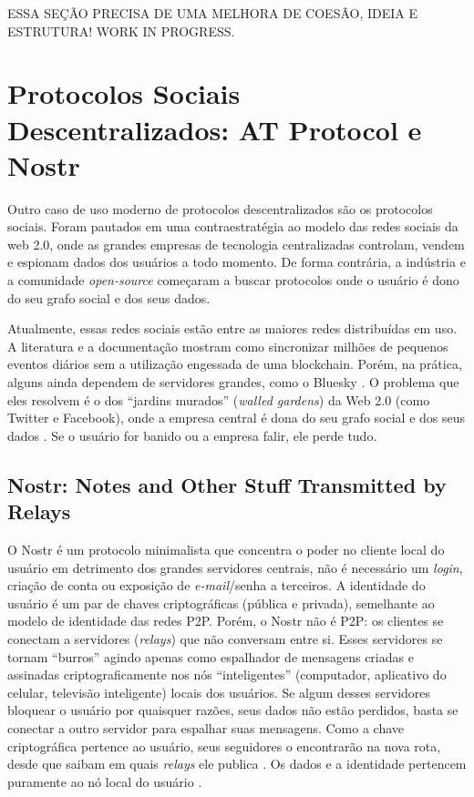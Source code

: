ESSA SEÇÃO PRECISA DE UMA MELHORA DE COESÃO, IDEIA E ESTRUTURA! WORK IN PROGRESS.

\section{Protocolos Sociais Descentralizados: AT Protocol e Nostr}

Outro caso de uso moderno de protocolos descentralizados são os protocolos sociais. Foram pautados em uma contraestratégia ao modelo das
redes sociais da web 2.0, onde as grandes empresas de tecnologia centralizadas controlam, vendem e espionam dados dos usuários a todo momento. De forma
contrária, a indústria e a comunidade \textit{open-source} começaram a buscar protocolos onde o usuário é dono do seu grafo social e dos seus dados.

Atualmente, essas redes sociais estão entre as maiores redes distribuídas em uso. A literatura e a documentação mostram como sincronizar milhões de pequenos
eventos diários sem a utilização engessada de uma blockchain. Porém, na prática, alguns ainda dependem de servidores grandes, como o Bluesky \cite{kleppmann2024bluesky}. O problema que eles resolvem é o dos ``jardins murados'' (\textit{walled gardens}) da
Web 2.0 (como Twitter e Facebook), onde a empresa central é dona do seu grafo social e dos seus dados \cite{bernerslee2010}. Se o usuário for banido ou a empresa falir, ele perde tudo.

\subsection{Nostr: Notes and Other Stuff Transmitted by Relays}

O Nostr é um protocolo minimalista que concentra o poder no cliente local do usuário em detrimento dos grandes servidores centrais, não é necessário um \textit{login},
criação de conta ou exposição de \textit{e-mail}/senha a terceiros. A identidade do usuário é um par de chaves criptográficas (pública e privada), semelhante ao modelo de identidade
das redes P2P. Porém, o Nostr não é P2P: os clientes se conectam a servidores (\textit{relays}) que não conversam entre si. Esses servidores se tornam ``burros'' agindo apenas como espalhador de mensagens criadas e assinadas criptograficamente nos nós
 ``inteligentes'' (computador, aplicativo do celular, televisão inteligente) locais dos usuários. Se algum desses servidores bloquear o usuário por quaisquer razões, seus
dados não estão perdidos, basta se conectar a outro servidor para espalhar suas mensagens. Como a chave criptográfica pertence ao usuário, seus seguidores o
encontrarão na nova rota, desde que saibam em quais \textit{relays} ele publica \cite{nip65}. Os dados e a identidade pertencem puramente ao nó local do usuário \cite{nip01}.

